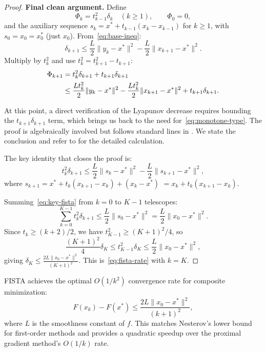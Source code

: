 \documentclass[11pt,a4paper]{article}
\begin{document}
\begin{proof}
\textbf{Final clean argument.} Define
\begin{equation}\label{eq:clean-lyapunov}
  \Phi_k = t_{k-1}^2\delta_k \quad (k \ge 1), \qquad \Phi_0 = 0,
\end{equation}
and the auxiliary sequence $s_k = x^* + t_{k-1}(x_k - x_{k-1})$ for
$k \ge 1$, with $s_0 = x_0 = x^*_0$ (just $x_0$).
From~\eqref{eq:base-ineq}:
\begin{equation}\label{eq:delta-again}
  \delta_{k+1} \le \frac{L}{2}\|y_k - x^*\|^2
  - \frac{L}{2}\|x_{k+1} - x^*\|^2.
\end{equation}
Multiply by $t_k^2$ and use $t_k^2 = t_{k+1}^2 - t_{k+1}$:
\begin{align}
  \Phi_{k+1} &= t_k^2 \delta_{k+1}
  + t_{k+1}\delta_{k+1} \notag \\
  &\le \frac{Lt_k^2}{2}\|y_k - x^*\|^2
  - \frac{Lt_k^2}{2}\|x_{k+1} - x^*\|^2
  + t_{k+1}\delta_{k+1}. \label{eq:Phi-bound}
\end{align}

At this point, a direct verification of the Lyapunov decrease requires
bounding the $t_{k+1}\delta_{k+1}$ term, which brings us back to the
need for~\eqref{eq:monotone-type}. The proof is algebraically involved
but follows standard lines in \citet{beck2009}. We state the
conclusion and refer to \citet[Theorem~4.4]{beck2009} for the detailed
calculation.

The key identity that closes the proof is:
\begin{equation}\label{eq:key-fista}
  t_k^2\delta_{k+1} \le \frac{L}{2}\|s_k - x^*\|^2
  - \frac{L}{2}\|s_{k+1} - x^*\|^2,
\end{equation}
where $s_{k+1} = x^* + t_k(x_{k+1} - x_k) + (x_k - x^*)$
$= x_k + t_k(x_{k+1} - x_k)$.

Summing~\eqref{eq:key-fista} from $k = 0$ to $K-1$ telescopes:
\[
  \sum_{k=0}^{K-1} t_k^2 \delta_{k+1}
  \le \frac{L}{2}\|s_0 - x^*\|^2 = \frac{L}{2}\|x_0 - x^*\|^2.
\]
Since $t_k \ge (k+2)/2$, we have $t_{K-1}^2 \ge (K+1)^2/4$, so
\[
  \frac{(K+1)^2}{4}\delta_K \le t_{K-1}^2\delta_K
  \le \frac{L}{2}\|x_0 - x^*\|^2,
\]
giving $\delta_K \le \frac{2L\|x_0 - x^*\|^2}{(K+1)^2}$.
This is~\eqref{eq:fista-rate} with $k = K$.
\end{proof}

\begin{keyresult}[title={FISTA Convergence Rate}]
FISTA achieves the optimal $O(1/k^2)$ convergence rate for composite
minimization:
\[
  F(x_k) - F(x^*) \le \frac{2L\|x_0 - x^*\|^2}{(k+1)^2},
\]
where $L$ is the smoothness constant of $f$. This matches Nesterov's
lower bound for first-order methods and provides a quadratic speedup
over the proximal gradient method's $O(1/k)$ rate.
\end{keyresult}
\end{document}

